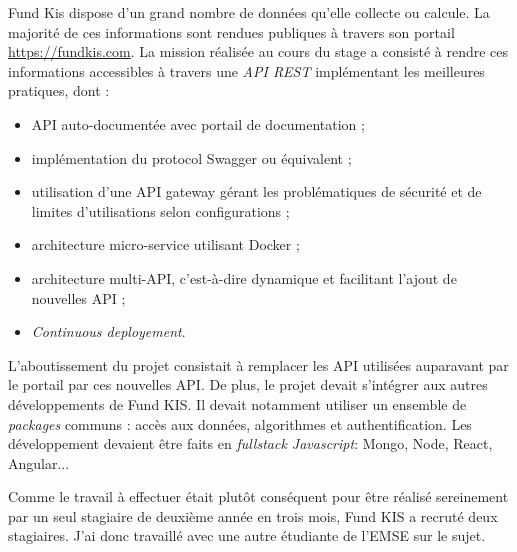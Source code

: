 Fund Kis dispose d'un grand nombre de données qu'elle collecte ou calcule. La majorité de ces informations sont rendues publiques à travers son portail \url{https://fundkis.com}. La mission réalisée au cours du stage a consisté à rendre ces informations accessibles à travers une \textit{API REST} implémentant les meilleures pratiques, dont :
\begin{itemize}[font=\color{blue}, label=]
  \item API auto-documentée avec portail de documentation ;
  \item implémentation du protocol Swagger ou équivalent ;
  \item utilisation d'une API gateway gérant les problématiques de sécurité et de limites d'utilisations selon configurations ;
  \item architecture micro-service utilisant Docker ;
  \item architecture multi-API, c'est-à-dire dynamique et facilitant l'ajout de nouvelles API ;
  \item \textit{Continuous deployement}.
\end{itemize}

L'aboutissement du projet consistait à remplacer les API utilisées auparavant par le portail par ces nouvelles API. De plus, le projet devait s'intégrer aux autres développements de Fund KIS. Il devait notamment utiliser un ensemble de \textit{packages} communs : accès aux données, algorithmes et authentification. Les développement devaient être faits en \textit{fullstack Javascript}: Mongo, Node, React, Angular...

Comme le travail à effectuer était plutôt conséquent pour être réalisé sereinement par un seul stagiaire de deuxième année en trois mois, Fund KIS a recruté deux stagiaires. J'ai donc travaillé avec une autre étudiante de l'EMSE sur le sujet.
